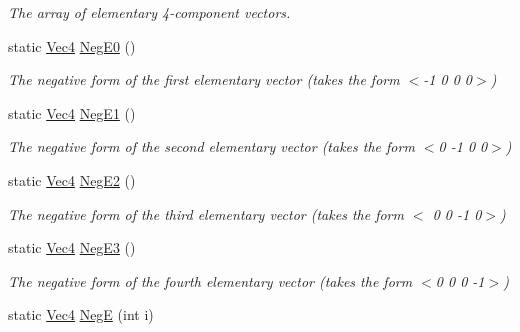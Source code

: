 \begin{DoxyCompactItemize}
\begin{DoxyCompactList}\small\item\em The array of elementary 4-\/component vectors. \end{DoxyCompactList}\item 
\hypertarget{classgofxmath_1_1_vec4_a2fa50c6cdf1193a2c58aad34b5b19e9a}{}static \hyperlink{classgofxmath_1_1_vec4}{Vec4} \hyperlink{classgofxmath_1_1_vec4_a2fa50c6cdf1193a2c58aad34b5b19e9a}{Neg\+E0} ()\label{classgofxmath_1_1_vec4_a2fa50c6cdf1193a2c58aad34b5b19e9a}

\begin{DoxyCompactList}\small\item\em The negative form of the first elementary vector (takes the form $<$-\/1 0 0 0$>$) \end{DoxyCompactList}\item 
\hypertarget{classgofxmath_1_1_vec4_abfaf4bf96bc5e4795427f217b38a72ee}{}static \hyperlink{classgofxmath_1_1_vec4}{Vec4} \hyperlink{classgofxmath_1_1_vec4_abfaf4bf96bc5e4795427f217b38a72ee}{Neg\+E1} ()\label{classgofxmath_1_1_vec4_abfaf4bf96bc5e4795427f217b38a72ee}

\begin{DoxyCompactList}\small\item\em The negative form of the second elementary vector (takes the form $<$0 -\/1 0 0$>$) \end{DoxyCompactList}\item 
\hypertarget{classgofxmath_1_1_vec4_ab6ef2b80c7859478770bc97b6d036460}{}static \hyperlink{classgofxmath_1_1_vec4}{Vec4} \hyperlink{classgofxmath_1_1_vec4_ab6ef2b80c7859478770bc97b6d036460}{Neg\+E2} ()\label{classgofxmath_1_1_vec4_ab6ef2b80c7859478770bc97b6d036460}

\begin{DoxyCompactList}\small\item\em The negative form of the third elementary vector (takes the form $<$ 0 0 -\/1 0$>$) \end{DoxyCompactList}\item 
\hypertarget{classgofxmath_1_1_vec4_aec76a1a3acfaf31a8a215b8f95b93d60}{}static \hyperlink{classgofxmath_1_1_vec4}{Vec4} \hyperlink{classgofxmath_1_1_vec4_aec76a1a3acfaf31a8a215b8f95b93d60}{Neg\+E3} ()\label{classgofxmath_1_1_vec4_aec76a1a3acfaf31a8a215b8f95b93d60}

\begin{DoxyCompactList}\small\item\em The negative form of the fourth elementary vector (takes the form $<$0 0 0 -\/1$>$) \end{DoxyCompactList}\item 
\hypertarget{classgofxmath_1_1_vec4_af708f40a781f76fba6e9cba99fd60798}{}static \hyperlink{classgofxmath_1_1_vec4}{Vec4} \hyperlink{classgofxmath_1_1_vec4_af708f40a781f76fba6e9cba99fd60798}{Neg\+E} (int i)\label{classgofxmath_1_1_vec4_af708f40a781f76fba6e9cba99fd60798}


\end{DoxyCompactItemize}
